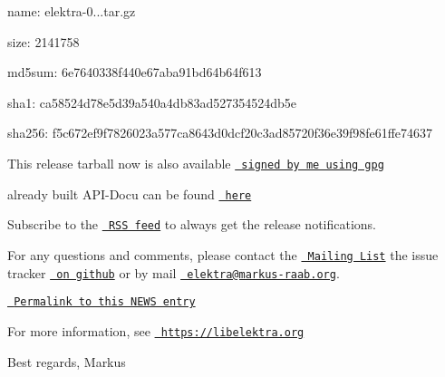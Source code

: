 \begin{DoxyItemize}
\item name\+: elektra-\/0...\+tar.\+gz
\item size\+: 2141758
\item md5sum\+: 6e7640338f440e67aba91bd64b64f613
\item sha1\+: ca58524d78e5d39a540a4db83ad527354524db5e
\item sha256\+: f5c672ef9f7826023a577ca8643d0dcf20c3ad85720f36e39f98fe61ffe74637
\end{DoxyItemize}

This release tarball now is also available \href{https://www.libelektra.org/ftp/elektra/releases/elektra-0.8.13.tar.gz.gpg}{\texttt{ signed by me using gpg}}

already built A\+P\+I-\/\+Docu can be found \href{https://doc.libelektra.org/api/0.8.13/html/}{\texttt{ here}}

Subscribe to the \href{https://doc.libelektra.org/news/feed.rss}{\texttt{ R\+SS feed}} to always get the release notifications.

For any questions and comments, please contact the \href{https://lists.sourceforge.net/lists/listinfo/registry-list}{\texttt{ Mailing List}} the issue tracker \href{https://git.libelektra.org/issues}{\texttt{ on github}} or by mail \href{mailto:elektra@markus-raab.org}{\texttt{ elektra@markus-\/raab.\+org}}.

\href{https://doc.libelektra.org/news/3c00a5f1-c017-4555-92b5-a2cf6e0803e3.html}{\texttt{ Permalink to this N\+E\+WS entry}}

For more information, see \href{https://libelektra.org}{\texttt{ https\+://libelektra.\+org}}

Best regards, Markus 